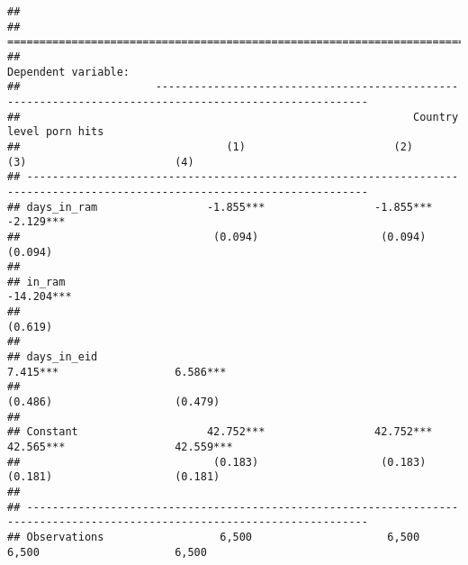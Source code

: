 \documentclass[]{article}
\begin{document}
\begin{verbatim}
## 
## ===========================================================================================================================
##                                                               Dependent variable:                                          
##                     -------------------------------------------------------------------------------------------------------
##                                                             Country level porn hits                                        
##                                (1)                       (2)                       (3)                       (4)           
## ---------------------------------------------------------------------------------------------------------------------------
## days_in_ram                 -1.855***                 -1.855***                                           -2.129***        
##                              (0.094)                   (0.094)                                             (0.094)         
##                                                                                                                            
## in_ram                                                                         -14.204***                                  
##                                                                                  (0.619)                                   
##                                                                                                                            
## days_in_eid                                                                     7.415***                  6.586***         
##                                                                                  (0.486)                   (0.479)         
##                                                                                                                            
## Constant                    42.752***                 42.752***                 42.565***                 42.559***        
##                              (0.183)                   (0.183)                   (0.181)                   (0.181)         
##                                                                                                                            
## ---------------------------------------------------------------------------------------------------------------------------
## Observations                  6,500                     6,500                     6,500                     6,500          

\end{verbatim}
\end{document}
